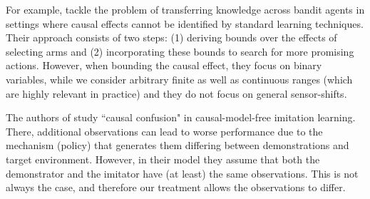 \documentclass[letterpaper]{article} %
\theoremstyle{definition}%
\theoremstyle{definition}
\newcommand{\todo}[1]{\textcolor{red}{#1}}
\begin{document}
%
For example, \cite{zhang2017transfer} tackle the problem of transferring knowledge across bandit agents in settings where causal effects cannot be identified by standard learning techniques. Their approach consists of two steps: (1) deriving bounds over the effects of selecting arms and (2) incorporating these bounds to search for more promising actions.
However, when bounding the causal effect, they focus on binary variables, while we consider arbitrary finite as well as continuous ranges (which are highly relevant in practice) and they do not focus on general sensor-shifts.

The authors of \cite{causalconfusion} study ``causal confusion" in causal-model-free imitation learning. There, additional observations can lead to worse performance due to the mechanism (policy) that generates them differing between demonstrations and target environment.
However, in their model they assume that both the demonstrator and the imitator have (at least) the same observations.
This is not always the case, and therefore our treatment allows the observations to differ.
\end{document}
